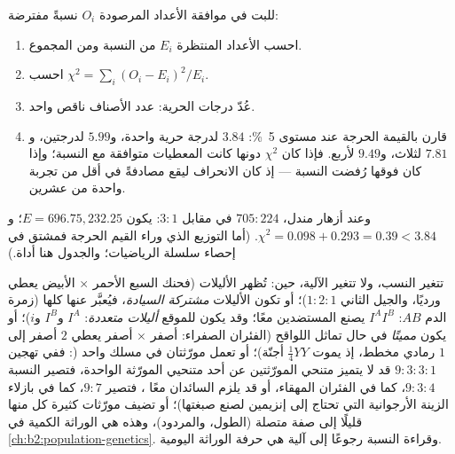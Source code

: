 \begin{method}\label{met:b2:meiosis-heredity:chisquare}
للبت في موافقة الأعداد المرصودة $O_i$ نسبةً مفترضة:
\begin{enumerate}
  \item احسب الأعداد المنتظرة $E_i$ من النسبة ومن المجموع.
  \item احسب $\chi^2 = \sum_i (O_i - E_i)^2/E_i$.
  \item عُدّ درجات الحرية: عدد الأصناف ناقص واحد.
  \item قارن بالقيمة الحرجة عند مستوى \qty{5}{\%}:
        $3.84$ لدرجة حرية واحدة، و$5.99$ لدرجتين، و$7.81$ لثلاث،
        و$9.49$ لأربع. فإذا كان $\chi^2$ دونها كانت المعطيات
        متوافقة مع النسبة؛ وإذا كان فوقها رُفضت النسبة --- إذ
        كان الانحراف ليقع مصادفةً في أقل من تجربة واحدة من عشرين.
\end{enumerate}
وعند أزهار مندل، $705 : 224$ في مقابل $3 : 1$: يكون $E = 696.75,
232.25$؛ و$\chi^2 = 0.098 + 0.293 = 0.39 < 3.84$. (أما التوزيع الذي
وراء القيم الحرجة فمشتق في إحصاء سلسلة الرياضيات؛ والجدول هنا أداة.)
\end{method}

\begin{proposition}\label{prop:b2:meiosis-heredity:extensions}
تتغير النسب، ولا تتغير الآلية، حين: تُظهر الأليلات
\emph{} (فحنك السبع الأحمر $\times$ الأبيض يعطي ورديًا،
والجيل الثاني $1 : 2 : 1$)؛ أو تكون الأليلات
\emph{مشتركة السيادة}، فيُعبَّر عنها كلها (زمرة الدم $AB$:  $I^AI^B$ يصنع المستضدين معًا؛ وقد يكون للموقع \emph{أليلات
متعددة}: $I^A$ و$I^B$ و$i$)؛ أو يكون  \emph{مميتًا} في حال
تماثل اللواقح (الفئران الصفراء: أصفر $\times$ أصفر يعطي $2$ أصفر إلى
$1$ رمادي مخطط، إذ يموت $\tfrac14 YY$ أجنّة)؛ أو تعمل مورّثتان في
مسلك واحد (\emph{}: ففي تهجين $9 : 3 : 3 : 1$ قد لا
يتميز متنحي المورّثتين عن أحد متنحيي المورّثة الواحدة، فتصير النسبة
$9 : 3 : 4$، كما في الفئران المهقاء، أو قد يلزم السائدان معًا ، فتصير $9 : 7$، كما في بازلاء الزينة الأرجوانية التي تحتاج
إلى إنزيمين لصنع صبغتها)؛ أو تضيف مورّثات كثيرة كل منها قليلًا إلى
صفة متصلة (الطول، والمردود)، وهذه هي الوراثة الكمية في
\cref{ch:b2:population-genetics}. وقراءة النسبة رجوعًا إلى آلية هي
حرفة الوراثة اليومية.
\end{proposition}

